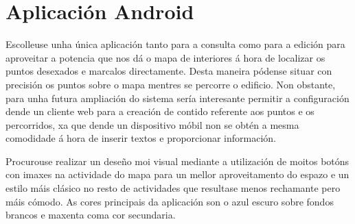 \section{Aplicación Android}
Escolleuse unha única aplicación tanto para a consulta como para a edición para aproveitar a potencia que nos dá o mapa de interiores á hora de localizar os puntos desexados e marcalos directamente. Desta maneira pódense situar con precisión os puntos sobre o mapa mentres se percorre o edificio. Non obstante, para unha futura ampliación do sistema sería interesante permitir a configuración dende un cliente web para a creación de contido referente aos puntos e os percorridos, xa que dende un dispositivo móbil non se obtén a mesma comodidade á hora de inserir textos e proporcionar información.

Procurouse realizar un deseño moi visual mediante a utilización de moitos botóns con imaxes na actividade do mapa para un mellor aproveitamento do espazo e un estilo máis clásico no resto de actividades que resultase menos rechamante pero máis cómodo. As cores principais da aplicación son o azul escuro sobre fondos brancos e maxenta coma cor secundaria.


